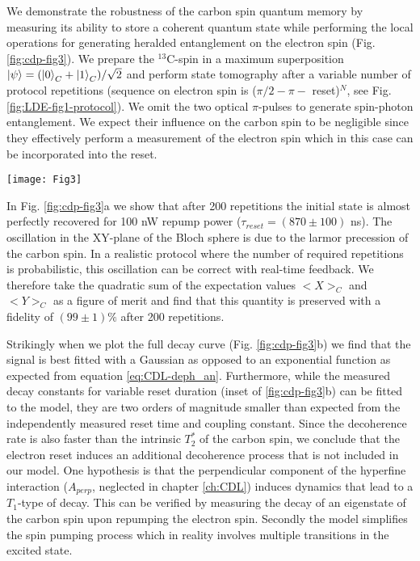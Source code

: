  We demonstrate the robustness of the carbon spin quantum memory by measuring its ability to store a coherent quantum state while performing the local operations for generating heralded entanglement on the electron spin (Fig. \ref{fig:cdp-fig3}). We prepare the $^{13}$C-spin in a maximum superposition $\left|\psi\right>=(\left|0\right>_C + \left|1\right>_C)/\sqrt{2}$ and perform state tomography after a variable number of protocol repetitions (sequence on electron spin is ($\pi/2 - \pi -$ reset)$^N$, see Fig. \ref{fig:LDE-fig1-protocol}). We omit the two optical $\pi$-pulses to generate spin-photon entanglement. We expect their influence on the carbon spin to be negligible since they effectively perform a measurement of the electron spin which in this case can be incorporated into the reset.
 \begin{figure*}
	\centering
	\texttt{[image: Fig3]}
	\caption{\label{fig:cdp-fig3} \textbf{} (a) Tomography of the nuclear spin initially prepared in a superposition as a function of number of repetitions of the heralded entanglement protocol. The repumping pulse is applied for 20 $\mu$s with a power of 100 nW, the time before and after the microwave $pi$-pulse is 200 ns. (b) Dephasing of the carbon spin for different repumping powers, with the same repump time and interpulse delay as in (a). Inset: the decay constants obtained from a fit to the data in (b) as a function of $\tau_{reset}$ for that laser power. }
\end{figure*}

In Fig. \ref{fig:cdp-fig3}a we show that after 200 repetitions the initial state is almost perfectly recovered for 100 nW repump power ($\tau_{reset} = (870 \pm 100)$ ns). The oscillation in the XY-plane of the Bloch sphere is due to the larmor precession of the carbon spin. In a realistic protocol where the number of required repetitions is probabilistic, this oscillation can be correct with real-time feedback. We therefore take the quadratic sum of the expectation values $<X>_C$ and $<Y>_C$ as a figure of merit and find that this quantity is preserved with a fidelity of $(99 \pm 1) \%$ after 200 repetitions.

Strikingly when we plot the full decay curve (Fig. \ref{fig:cdp-fig3}b) we find that the signal is best fitted with a Gaussian as opposed to an exponential function as expected from equation \ref{eq:CDL-deph_an}. Furthermore, while the measured decay constants for variable reset duration (inset of \ref{fig:cdp-fig3}b) can be fitted to the model, they are two orders of magnitude smaller than expected from the independently measured reset time and coupling constant. Since the decoherence rate is also faster than the intrinsic $T_2^{*}$ of the carbon spin, we conclude that the electron reset induces an additional decoherence process that is not included in our model. One hypothesis is that the perpendicular component of the hyperfine interaction ($A_{perp}$, neglected in chapter \ref{ch:CDL}) induces dynamics that lead to a $T_1$-type of decay. This can be verified by measuring the decay of an eigenstate of the carbon spin upon repumping the electron spin. Secondly the model simplifies the spin pumping process which in reality involves multiple transitions in the excited state. 

